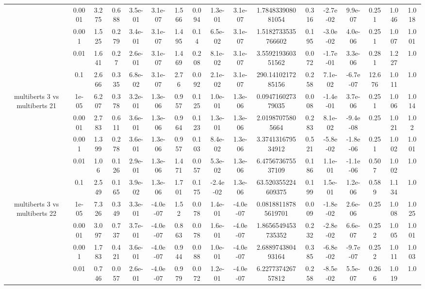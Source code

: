\begin{tabular}{|c|c|c|c|c|c|c|c|c|c|c|c|c|c|c|c|c|}
 & 0.0001 & 3.275 & 0.688 & 3.5e-01 & 3.1e-07 & 1.566 & 0.094 & 1.3e-01 & 3.1e-07 & 1.784833908081054 & 0.316 & -2.7e-02 & 9.9e-07 & 0.251 & 1.046 & 1.018 \\
 & 0.001 & 1.525 & 0.279 & 3.4e-01 & 3.1e-07 & 1.495 & 0.14 & 6.5e-02 & 3.1e-07 & 1.5182733535766602 & 0.195 & -3.0e-02 & 4.0e-06 & 0.251 & 1.007 & 1.001 \\
 & 0.01 & 1.641 & 0.27 & 2.6e-01 & 3.1e-07 & 1.469 & 0.208 & 8.1e-02 & 3.1e-07 & 3.559219360351562 & 0.072 & -1.7e-01 & 3.3e-06 & 0.281 & 1.227 & 1.0 \\
 & 0.1 & 2.666 & 0.335 & 6.8e-02 & 3.1e-07 & 2.76 & 0.092 & 2.1e-02 & 3.1e-07 & 290.1410217285156 & 0.258 & 7.1e-02 & -6.7e-07 & 12.676 & 1.011 & 1.0 \\
\hline
\multirow{5}{*}{multiberts 3 vs multiberts 21} & 1e-05 & 6.207 & 0.378 & 3.2e-01 & 1.3e-06 & 0.957 & 0.125 & 1.0e-01 & 1.3e-06 & 0.094716027379035 & 0.008 & -1.4e-01 & 3.7e-06 & 0.251 & 1.006 & 1.014 \\
 & 0.0001 & 2.783 & 0.611 & 3.6e-01 & 1.3e-06 & 0.964 & 0.123 & 1.3e-01 & 1.3e-06 & 2.01987075805664 & 0.283 & 8.1e-02 & -9.4e-08 & 0.25 & 1.021 & 1.02 \\
 & 0.001 & 1.399 & 0.278 & 3.6e-01 & 1.3e-06 & 0.957 & 0.103 & 8.4e-02 & 1.3e-06 & 3.374131679534912 & 0.521 & -5.8e-02 & -1.8e-06 & 0.251 & 1.002 & 1.001 \\
 & 0.01 & 1.06 & 0.126 & 2.9e-01 & 1.3e-06 & 1.471 & 0.057 & 5.3e-02 & 1.3e-06 & 6.475673675537109 & 0.186 & 1.1e-01 & -1.1e-06 & 0.507 & 1.002 & 1.0 \\
 & 0.1 & 2.549 & 0.165 & 3.9e-02 & 1.3e-06 & 1.701 & 0.175 & -2.4e-02 & 1.3e-06 & 63.520355224609375 & 0.199 & 1.5e-01 & 1.2e-06 & 0.589 & 1.134 & 1.0 \\
\hline
\multirow{5}{*}{multiberts 3 vs multiberts 22} & 1e-05 & 7.326 & 0.349 & 3.3e-01 & -4.0e-07 & 1.52 & 0.078 & 1.4e-01 & -4.0e-07 & 0.08188118785619701 & 0.009 & -1.8e-02 & 2.6e-06 & 0.25 & 1.008 & 1.025 \\
 & 0.0001 & 3.097 & 0.737 & 3.7e-01 & -4.0e-07 & 0.863 & 0.078 & 1.6e-01 & -4.0e-07 & 1.8656549453735352 & 0.232 & -2.8e-02 & 6.6e-07 & 0.252 & 1.005 & 1.001 \\
 & 0.001 & 1.783 & 0.421 & 3.6e-01 & -4.0e-07 & 0.944 & 0.088 & 1.0e-01 & -4.0e-07 & 2.688974380493164 & 0.385 & -6.8e-02 & -9.7e-07 & 0.252 & 1.011 & 1.003 \\
 & 0.01 & 0.746 & 0.057 & 2.6e-01 & -4.0e-07 & 0.979 & 0.072 & 1.2e-01 & -4.0e-07 & 6.227737426757812 & 0.258 & -8.5e-02 & 5.5e-07 & 0.266 & 1.019 & 1.0 \\

\end{tabular}
